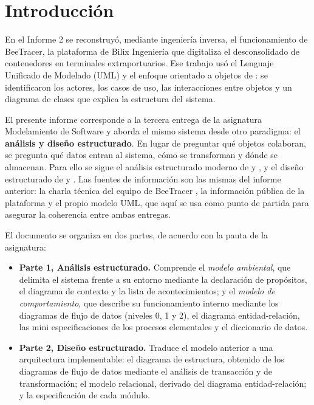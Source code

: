 \chapter{Introducción}
\label{cap:introduccion}

En el Informe 2 se reconstruyó, mediante ingeniería inversa, el funcionamiento de BeeTracer,
la plataforma de Bilix Ingeniería que digitaliza el desconsolidado de contenedores en
terminales extraportuarios. Ese trabajo usó el Lenguaje Unificado de Modelado (UML) y el
enfoque orientado a objetos de \textcite{larman2003}: se identificaron los actores, los casos de
uso, las interacciones entre objetos y un diagrama de clases que explica la estructura del
sistema.

El presente informe corresponde a la tercera entrega de la asignatura Modelamiento de Software
y aborda el mismo sistema desde otro paradigma: el \textbf{análisis y diseño estructurado}. En
lugar de preguntar qué objetos colaboran, se pregunta qué datos entran al sistema, cómo se
transforman y dónde se almacenan. Para ello se sigue el análisis estructurado moderno de
\textcite{yourdon1989} y \textcite{demarco1979}, y el diseño estructurado de
\textcite{yourdon1979} y \textcite{pagejones1988}. Las fuentes de información son las mismas
del informe anterior: la charla técnica del equipo de BeeTracer
\parencite{charlabeetracer2026}, la información pública de la plataforma \parencite{bilix_sf}
y el propio modelo UML, que aquí se usa como punto de partida para asegurar la coherencia
entre ambas entregas.

El documento se organiza en dos partes, de acuerdo con la pauta de la asignatura:

\begin{itemize}
    \item \textbf{Parte 1, Análisis estructurado.} Comprende el \emph{modelo ambiental}, que
    delimita el sistema frente a su entorno mediante la declaración de propósitos, el
    diagrama de contexto y la lista de acontecimientos; y el \emph{modelo de comportamiento},
    que describe su funcionamiento interno mediante los diagramas de flujo de datos (niveles
    0, 1 y 2), el diagrama entidad-relación, las mini especificaciones de los procesos
    elementales y el diccionario de datos.
    \item \textbf{Parte 2, Diseño estructurado.} Traduce el modelo anterior a una
    arquitectura implementable: el diagrama de estructura, obtenido de los diagramas de flujo
    de datos mediante el análisis de transacción y de transformación; el modelo relacional,
    derivado del diagrama entidad-relación; y la especificación de cada módulo.
\end{itemize}

